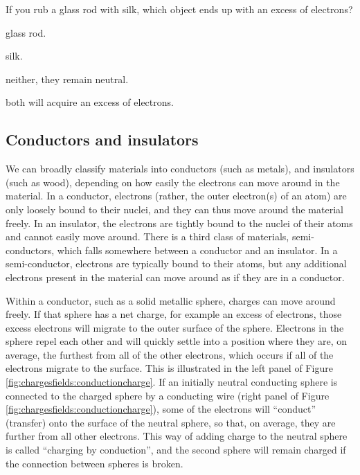 \begin{checkpoint}\label{cp:chargesfields:tribo}
\begin{MCquestion}{If you rub a glass rod with silk, which object ends up with an excess of electrons?}
\item glass rod.
\item silk. \correct
\item neither, they remain neutral.
\item both will acquire an excess of electrons.
\end{MCquestion}
\end{checkpoint}

\subsection{Conductors and insulators}
We can broadly classify materials into conductors (such as metals), and insulators (such as wood), depending on how easily the electrons can move around in the material. In a conductor, electrons (rather, the outer electron(s) of an atom) are only loosely bound to their nuclei, and they can thus move around the material freely. In an insulator, the electrons are tightly bound to the nuclei of their atoms and cannot easily move around. There is a third class of materials, semi-conductors, which falls somewhere between a conductor and an insulator. In a semi-conductor, electrons are typically bound to their atoms, but any additional electrons present in the material can move around as if they are in a conductor. 

Within a conductor, such as a solid metallic sphere, charges can move around freely. If that sphere has a net charge, for example an excess of electrons, those excess electrons will migrate to the outer surface of the sphere. Electrons in the sphere repel each other and will quickly settle into a position where they are, on average, the furthest from all of the other electrons, which occurs if all of the electrons migrate to the surface. This is illustrated in the left panel of Figure \ref{fig:chargesfields:conductioncharge}. If an initially neutral conducting sphere is connected to the charged sphere by a conducting wire (right panel of Figure \ref{fig:chargesfields:conductioncharge}), some of the electrons will ``conduct'' (transfer) onto the surface of the neutral sphere, so that, on average, they are further from all other electrons. This way of adding charge to the neutral sphere is called ``charging by conduction'', and the second sphere will remain charged if the connection between spheres is broken.

